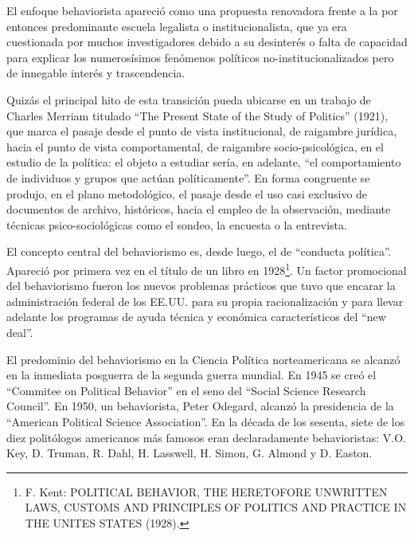 \documentclass[
]{book}
\begin{document}
El enfoque behaviorista apareció como una propuesta renovadora frente a la por entonces predominante escuela legalista o institucionalista, que ya era cuestionada por muchos investigadores debido a su desinterés o falta de capacidad para explicar los numerosísimos fenómenos políticos no-institucionalizados pero de innegable interés y trascendencia.

Quizás el principal hito de esta transición pueda ubicarse en un trabajo de Charles Merriam titulado ``The Present State of the Study of Politics'' (1921), que marca el pasaje desde el punto de vista institucional, de raigambre jurídica, hacia el punto de vista comportamental, de raigambre socio-psicológica, en el estudio de la política: el objeto a estudiar sería, en adelante, ``el comportamiento de individuos y grupos que actúan políticamente''. En forma congruente se produjo, en el plano metodológico, el pasaje desde el uso casi exclusivo de documentos de archivo, históricos, hacia el empleo de la observación, mediante técnicas psico-sociológicas como el sondeo, la encuesta o la entrevista.

El concepto central del behaviorismo es, desde luego, el de ``conducta política''. Apareció por primera vez en el título de un libro en 1928\footnote{F. Kent: POLITICAL BEHAVIOR, THE HERETOFORE UNWRITTEN LAWS, CUSTOMS AND PRINCIPLES OF POLITICS AND PRACTICE IN THE UNITES STATES (1928).}. Un factor promocional del behaviorismo fueron los nuevos problemas prácticos que tuvo que encarar la administración federal de los EE.UU. para su propia racionalización y para llevar adelante los programas de ayuda técnica y económica característicos del ``new deal''.

El predominio del behaviorismo en la Ciencia Política norteamericana se alcanzó en la inmediata posguerra de la segunda guerra mundial. En 1945 se creó el ``Commitee on Political Behavior'' en el seno del ``Social Science Research Council''. En 1950, un behaviorista, Peter Odegard, alcanzó la presidencia de la ``American Political Science Association''. En la década de los sesenta, siete de los diez politólogos americanos más famosos eran declaradamente behavioristas: V.O. Key, D. Truman, R. Dahl, H. Lasswell, H. Simon, G. Almond y D. Easton.
\end{document}
